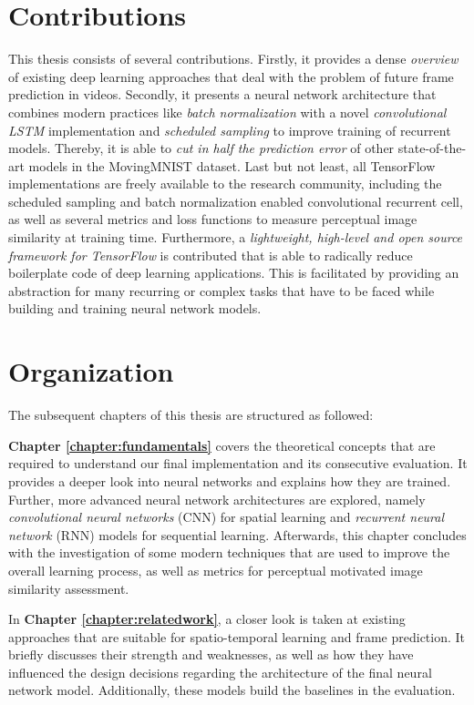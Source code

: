 \section{Contributions}

This thesis consists of several contributions. Firstly, it provides a dense \textit{overview} of existing deep learning approaches that deal with the problem of future frame prediction in videos. Secondly, it presents a neural network architecture that combines modern practices like \textit{batch normalization} with a novel \textit{convolutional LSTM} implementation and \textit{scheduled sampling} to improve training of recurrent models. Thereby, it is able to \textit{cut in half the prediction error} of other state-of-the-art models in the MovingMNIST dataset. Last but not least, all TensorFlow implementations are freely available to the research community, including the scheduled sampling and batch normalization enabled convolutional recurrent cell, as well as several metrics and loss functions to measure perceptual image similarity at training time. Furthermore, a \textit{lightweight, high-level and open source framework for TensorFlow} is contributed that is able to radically reduce boilerplate code of deep learning applications. This is facilitated by providing an abstraction for many recurring or complex tasks that have to be faced while building and training neural network models.


\section{Organization}

The subsequent chapters of this thesis are structured as followed:

\textbf{Chapter \ref{chapter:fundamentals}} covers the theoretical concepts that are required to understand our final implementation and its consecutive evaluation. It provides a deeper look into neural networks and explains how they are trained. Further, more advanced neural network architectures are explored, namely \textit{convolutional neural networks} (CNN) for spatial learning and \textit{recurrent neural network} (RNN) models for sequential learning. Afterwards, this chapter concludes with the investigation of some modern techniques that are used to improve the overall learning process, as well as metrics for perceptual motivated image similarity assessment.

In \textbf{Chapter \ref{chapter:relatedwork}}, a closer look is taken at existing approaches that are suitable for spatio-temporal learning and frame prediction. It briefly discusses their strength and weaknesses, as well as how they have influenced the design decisions regarding the architecture of the final neural network model. Additionally, these models build the baselines in the evaluation.

